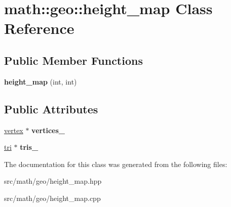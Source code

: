 \hypertarget{classmath_1_1geo_1_1height__map}{
\section{math::geo::height\_\-map Class Reference}
\label{classmath_1_1geo_1_1height__map}
}
\subsection*{Public Member Functions}
\begin{DoxyCompactItemize}
\item 
\hypertarget{classmath_1_1geo_1_1height__map_a56685f77f9750167f419366039118113}{
{\bfseries height\_\-map} (int, int)}
\label{classmath_1_1geo_1_1height__map_a56685f77f9750167f419366039118113}

\end{DoxyCompactItemize}
\subsection*{Public Attributes}
\begin{DoxyCompactItemize}
\item 
\hypertarget{classmath_1_1geo_1_1height__map_add2b5f09f8bf6a3d7c674afd0fcb0ee4}{
\hyperlink{classmath_1_1geo_1_1vertex}{vertex} $\ast$ {\bfseries vertices\_\-}}
\label{classmath_1_1geo_1_1height__map_add2b5f09f8bf6a3d7c674afd0fcb0ee4}

\item 
\hypertarget{classmath_1_1geo_1_1height__map_a29abf1041ebd17777d88a2b55ef82535}{
\hyperlink{classmath_1_1geo_1_1tri}{tri} $\ast$ {\bfseries tris\_\-}}
\label{classmath_1_1geo_1_1height__map_a29abf1041ebd17777d88a2b55ef82535}

\end{DoxyCompactItemize}


The documentation for this class was generated from the following files:\begin{DoxyCompactItemize}
\item 
src/math/geo/height\_\-map.hpp\item 
src/math/geo/height\_\-map.cpp\end{DoxyCompactItemize}
